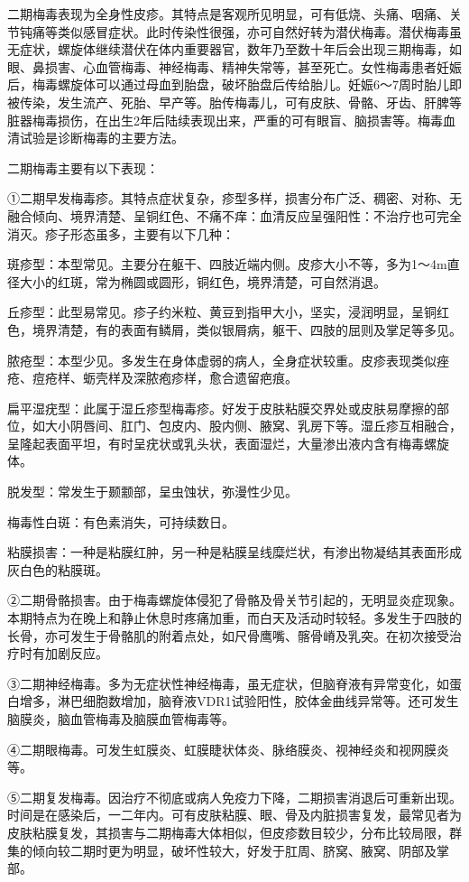 \documentclass[12pt,UTF8]{ctexbook}
\begin{document}
二期梅毒表现为全身性皮疹。其特点是客观所见明显，可有低烧、头痛、咽痛、关节钝痛等类似感冒症状。此时传染性很强，亦可自然好转为潜伏梅毒。潜伏梅毒虽无症状，螺旋体继续潜伏在体内重要器官，数年乃至数十年后会出现三期梅毒，如眼、鼻损害、心血管梅毒、神经梅毒、精神失常等，甚至死亡。女性梅毒患者妊娠后，梅毒螺旋体可以通过母血到胎盘，破坏胎盘后传给胎儿。妊娠6～7周时胎儿即被传染，发生流产、死胎、早产等。胎传梅毒儿，可有皮肤、骨骼、牙齿、肝脾等脏器梅毒损伤，在出生2年后陆续表现出来，严重的可有眼盲、脑损害等。梅毒血清试验是诊断梅毒的主要方法。

二期梅毒主要有以下表现：

①二期早发梅毒疹。其特点症状复杂，疹型多样，损害分布广泛、稠密、对称、无融合倾向、境界清楚、呈铜红色、不痛不痒：血清反应呈强阳性：不治疗也可完全消灭。疹子形态虽多，主要有以下几种：

斑疹型：本型常见。主要分在躯干、四肢近端内侧。皮疹大小不等，多为1～4m直径大小的红斑，常为椭圆或圆形，铜红色，境界清楚，可自然消退。

丘疹型：此型易常见。疹子约米粒、黄豆到指甲大小，坚实，浸润明显，呈铜红色，境界清楚，有的表面有鳞屑，类似银屑病，躯干、四肢的屈则及掌足等多见。

脓疮型：本型少见。多发生在身体虚弱的病人，全身症状较重。皮疹表现类似痤疮、痘疮样、蛎壳样及深脓疱疹样，愈合遗留疤痕。

扁平湿疣型：此属于湿丘疹型梅毒疹。好发于皮肤粘膜交界处或皮肤易摩擦的部位，如大小阴唇间、肛门、包皮内、股内侧、腋窝、乳房下等。湿丘疹互相融合，呈隆起表面平坦，有时呈疣状或乳头状，表面湿烂，大量渗出液内含有梅毒螺旋体。

脱发型：常发生于颞颥部，呈虫蚀状，弥漫性少见。

梅毒性白斑：有色素消失，可持续数日。

粘膜损害：一种是粘膜红肿，另一种是粘膜呈线糜烂状，有渗出物凝结其表面形成灰白色的粘膜斑。

②二期骨骼损害。由于梅毒螺旋体侵犯了骨骼及骨关节引起的，无明显炎症现象。本期特点为在晚上和静止休息时疼痛加重，而白天及活动时较轻。多发生于四肢的长骨，亦可发生于骨骼肌的附着点处，如尺骨鹰嘴、髂骨嵴及乳突。在初次接受治疗时有加剧反应。

③二期神经梅毒。多为无症状性神经梅毒，虽无症状，但脑脊液有异常变化，如蛋白增多，淋巴细胞数增加，脑脊液VDR1试验阳性，胶体金曲线异常等。还可发生脑膜炎，脑血管梅毒及脑膜血管梅毒等。

④二期眼梅毒。可发生虹膜炎、虹膜睫状体炎、脉络膜炎、视神经炎和视网膜炎等。

⑤二期复发梅毒。因治疗不彻底或病人免疫力下降，二期损害消退后可重新出现。时间是在感染后，一二年内。可有皮肤粘膜、眼、骨及内脏损害复发，最常见者为皮肤粘膜复发，其损害与二期梅毒大体相似，但皮疹数目较少，分布比较局限，群集的倾向较二期时更为明显，破坏性较大，好发于肛周、脐窝、腋窝、阴部及掌部。
\end{document}
